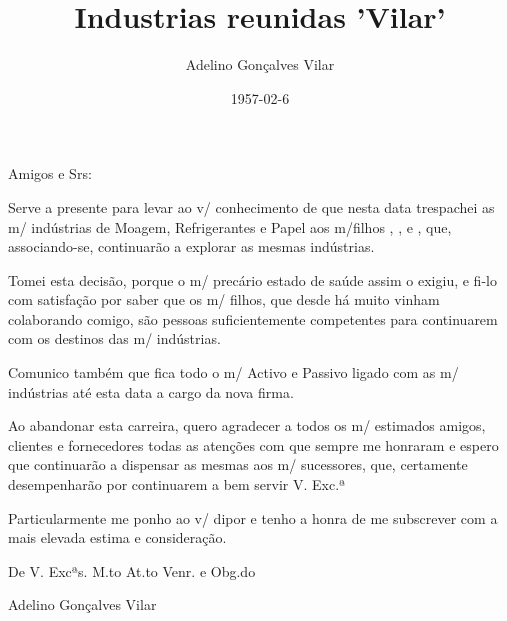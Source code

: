 \documentclass{article}
\title{Industrias reunidas 'Vilar'}
\author{Adelino Gonçalves Vilar}
\date{1957-02-6}
\begin{document}
\maketitle
Amigos e Srs:

Serve a presente para levar ao v/ conhecimento de que nesta data trespachei as m/ indústrias de Moagem,  Refrigerantes e Papel aos m/filhos , ,  e , que, associando-se, continuarão a explorar as mesmas indústrias.

Tomei esta decisão, porque o m/ precário estado de saúde assim o exigiu, e fi-lo com satisfação por saber que os m/ filhos, que desde há muito vinham colaborando comigo, são pessoas suficientemente competentes para continuarem com os destinos das m/ indústrias.

Comunico também que fica todo o m/ Activo e Passivo ligado com as m/ indústrias até esta data a cargo da nova firma.

Ao abandonar esta carreira, quero agradecer a todos os m/ estimados amigos, clientes e fornecedores todas as atenções com que sempre me honraram e espero que continuarão a dispensar as mesmas aos m/ sucessores, que, certamente desempenharão por continuarem a bem servir V. Exc.ª

Particularmente me ponho ao v/ dipor e tenho a honra de me subscrever com a mais elevada estima e consideração.

De V. Excªs.
M.to At.to Venr. e Obg.do

Adelino Gonçalves Vilar

\printindex
\end{document}
